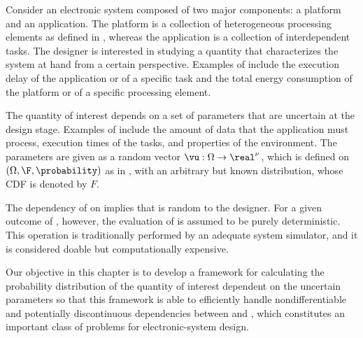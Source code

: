 Consider an electronic system composed of two major components: a platform and
an application. The platform is a collection of heterogeneous processing
elements as defined in , whereas the application is a
collection of interdependent tasks. The designer is interested in studying a
quantity \g that characterizes the system at hand from a certain perspective.
Examples of \g include the execution delay of the application or of a specific
task and the total energy consumption of the platform or of a specific
processing element.

The quantity of interest \g depends on a set of parameters \vu that are
uncertain at the design stage. Examples of \vu include the amount of data that
the application must process, execution times of the tasks, and properties of
the environment. The parameters \vu are given as a random vector $\vu: \Omega
\to \real^\nu$, which is defined on $(\Omega, \F, \probability)$ as in
, with an arbitrary but known distribution, whose
\ac{CDF} is denoted by $F$.

The dependency of \g on \vu implies that \g is random to the designer. For a
given outcome of \vu, however, the evaluation of \g is assumed to be purely
deterministic. This operation is traditionally performed by an adequate system
simulator, and it is considered doable but computationally expensive.

Our objective in this chapter is to develop a framework for calculating the
probability distribution of the quantity of interest \g dependent on the
uncertain parameters \vu so that this framework is able to efficiently handle
nondifferentiable and potentially discontinuous dependencies between \g and \vu,
which constitutes an important class of problems for electronic-system design.
